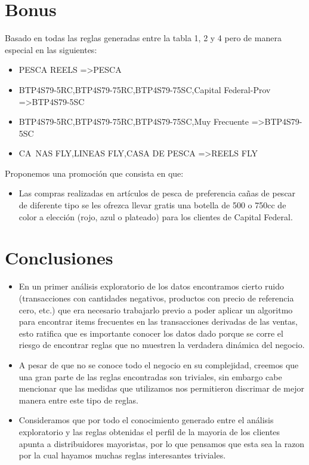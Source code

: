 \documentclass[]{article}
\begin{document}
	\section{Bonus}
	Basado en todas las reglas generadas entre la tabla 1, 2 y 4 pero de manera especial en las siguientes:\\
	\begin{itemize}
		\item PESCA REELS =\textgreater PESCA
		\item BTP4S79-5RC,BTP4S79-75RC,BTP4S79-75SC,Capital Federal-Prov =\textgreater BTP4S79-5SC
		\item BTP4S79-5RC,BTP4S79-75RC,BTP4S79-75SC,Muy Frecuente =\textgreater BTP4S79-5SC
		\item CA~NAS FLY,LINEAS FLY,CASA DE PESCA =\textgreater REELS FLY\\
	\end{itemize}
	 Proponemos una promoción que consista en que: 
	\begin{itemize}
		\item Las compras realizadas en artículos de pesca de preferencia cañas de pescar de diferente tipo se les ofrezca llevar gratis una botella de 500 o 750cc de color a elección (rojo, azul o plateado) para los clientes de Capital Federal.\\
	\end{itemize}

	\section{Conclusiones}
	\begin{itemize}
		\item En un primer análisis exploratorio de los datos encontramos cierto ruido (transacciones con cantidades negativos, productos con precio de referencia cero, etc.) que era necesario trabajarlo previo a poder aplicar un algoritmo para encontrar items frecuentes en las transacciones derivadas de las ventas, esto ratifica que es importante conocer los datos dado porque se corre el riesgo de encontrar reglas que no muestren la verdadera dinámica del negocio.\\
		\item A pesar de que no se conoce todo el negocio en su complejidad, creemos que una gran parte de las reglas encontradas son triviales, sin embargo cabe mencionar que las medidas que utilizamos nos permitieron discrimar de mejor manera entre este tipo de reglas.\\
		\item Consideramos que por todo el conocimiento generado entre el análisis exploratorio y las reglas obtenidas el perfil de la mayoria de los clientes apunta a distribuidores mayoristas, por lo que pensamos que esta sea la razon por la cual hayamos muchas reglas interesantes triviales.\\
	\end{itemize}
	
\end{document}
